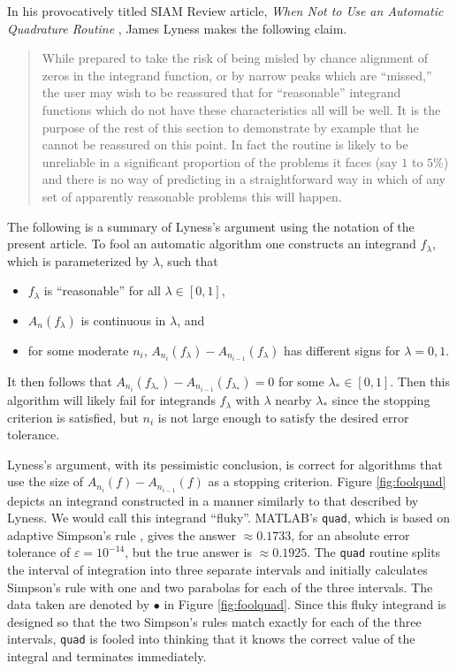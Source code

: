 \documentclass[]{elsarticle}
\theoremstyle{definition}
\theoremstyle{remark}
\begin{document}
In his provocatively titled SIAM Review article, \emph{When Not to Use an Automatic Quadrature Routine} \cite[p.\ 69]{Lyn83}, James Lyness makes the following claim.
\begin{quote}
While prepared to take the risk of being misled by chance alignment of zeros in the integrand function, or by narrow peaks which are ``missed,'' the user may wish to be reassured that for ``reasonable'' integrand functions which do not have these characteristics all will be well. It is the purpose of the rest of this section to demonstrate by example that he cannot be reassured on this point. In fact the routine is likely to be unreliable in a significant proportion of the problems it faces (say $1$ to $5\%$) and there is no way of predicting in a straightforward way in which of any set of apparently reasonable problems this will happen.
\end{quote}

The following is a summary of Lyness's argument using the notation of the present article. To fool an automatic algorithm one constructs an integrand $f_\lambda$, which is parameterized by $\lambda$, such that 
\begin{itemize}
\item $f_\lambda$ is ``reasonable'' for all $\lambda \in [0,1]$,
\item $A_n(f_\lambda)$ is continuous in $\lambda$, and 
\item for some moderate $n_i$, $A_{n_{i}}(f_\lambda)-A_{n_{i-1}}(f_\lambda)$ has different signs for $\lambda=0,1$.  
\end{itemize}
It then follows that $A_{n_{i}}(f_{\lambda_*})-A_{n_{i-1}}(f_{\lambda_*})=0$ for some $\lambda_* \in [0,1]$.  Then this algorithm will likely fail for integrands $f_{\lambda}$ with $\lambda$ nearby $\lambda_*$ since the stopping criterion is satisfied, but $n_i$ is not large enough to satisfy the desired error tolerance.

Lyness's argument, with its pessimistic conclusion, is correct for algorithms that use the size of $A_{n_{i}}(f)-A_{n_{i-1}}(f)$ as a stopping criterion.  Figure \ref{fig:foolquad} depicts an integrand constructed in a manner similarly to that described by Lyness.  We would call this integrand ``fluky''.  MATLAB's {\tt quad}, which is based on adaptive Simpson's rule  \citep{GanGau00a}, gives the answer $\approx 0.1733$, for an absolute error tolerance of $\varepsilon=10^{-14}$, but the true answer is $\approx 0.1925$.  The {\tt quad} routine splits the interval of integration into three separate intervals and initially calculates Simpson's rule with one and two parabolas for each of the three intervals.  The data taken are denoted by $\bullet$ in Figure \ref{fig:foolquad}.  Since this fluky integrand is designed so that the two Simpson's rules match exactly for each of the three intervals, {\tt quad} is fooled into thinking that it knows the correct value of the integral and terminates immediately.
\end{document}
